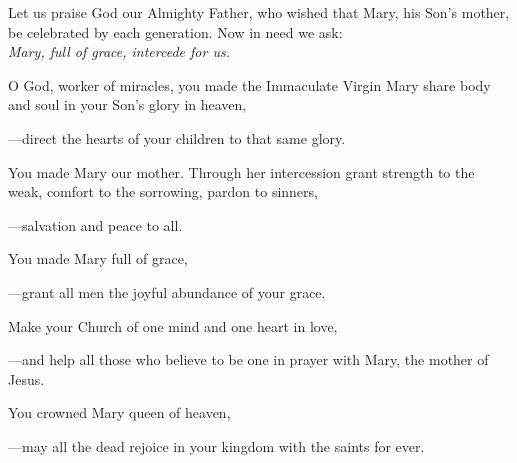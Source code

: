 \intercessions\indent

\begin{hangpar}

Let us praise God our Almighty Father, who wished that Mary, his Son’s mother, be celebrated by each generation. Now in need we ask:\\
\emph{Mary, full of grace, intercede for us.}

\medskip O God, worker of miracles, you made the Immaculate Virgin Mary share body and soul in your Son’s glory in heaven,

{\color{red}---\thinspace}direct the hearts of your children to that same glory.

\medskip You made Mary our mother. Through her intercession grant strength to the weak, comfort to the sorrowing, pardon to sinners,

{\color{red}---\thinspace}salvation and peace to all.

\medskip You made Mary full of grace,

{\color{red}---\thinspace}grant all men the joyful abundance of your grace.

\medskip Make your Church of one mind and one heart in love,

{\color{red}---\thinspace}and help all those who believe to be one in prayer with Mary, the mother of Jesus.

\medskip You crowned Mary queen of heaven,

{\color{red}---\thinspace}may all the dead rejoice in your kingdom with the saints for ever.

\end{hangpar}